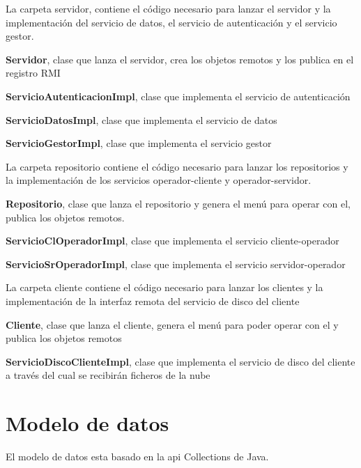 La carpeta servidor, contiene el código necesario para lanzar el servidor y la implementación del servicio de datos, el servicio de autenticación y el servicio gestor.

\begin{compactitem}
	\item \textbf{Servidor}, clase que lanza el servidor, crea los objetos remotos y los publica en el registro RMI
	\item \textbf{ServicioAutenticacionImpl}, clase que implementa el servicio de autenticación
	\item \textbf{ServicioDatosImpl}, clase que implementa el servicio de datos
	\item \textbf{ServicioGestorImpl}, clase que implementa el servicio gestor
\end{compactitem}

La carpeta repositorio contiene el código necesario para lanzar los repositorios y la implementación de los servicios operador-cliente y operador-servidor.

\begin{compactitem}
	\item \textbf{Repositorio}, clase que lanza el repositorio y genera el menú para operar con el, publica los objetos remotos.
	\item \textbf{ServicioClOperadorImpl}, clase que implementa el servicio cliente-operador
	\item \textbf{ServicioSrOperadorImpl}, clase que implementa el servicio servidor-operador
\end{compactitem}

La carpeta cliente contiene el código necesario para lanzar los clientes y la implementación de la interfaz remota del servicio de disco del cliente

\begin{compactitem}
	\item \textbf{Cliente}, clase que lanza el cliente, genera el menú para poder operar con el y publica los objetos remotos
	\item \textbf{ServicioDiscoClienteImpl}, clase que implementa el servicio de disco del cliente a través del cual se recibirán ficheros de la nube
\end{compactitem}

\section{Modelo de datos}

El modelo de datos esta basado en la api Collections de Java.

